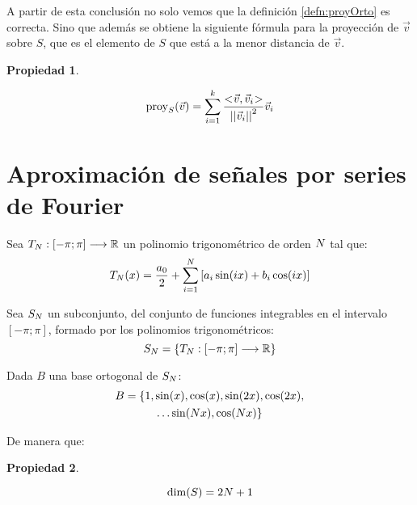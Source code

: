 \documentclass[a5paper,12pt,twoside]{book}
\newtheorem{prop}{{Propiedad}}[chapter]
\begin{document}
A partir de esta conclusión no solo vemos que la definición \ref{defn:proyOrto} es correcta.
Sino que además se obtiene la siguiente fórmula para la proyección de $\Vec{v}$ sobre $S$, que es el elemento de $S$ que está a la menor distancia de $\Vec{v}$.

\begin{mdframed}[style=PropertyFrame]
    \begin{prop}
        \label{prop:proyOrto2}
    \end{prop}
    \begin{equation*}
        \operatorname{proy}_S(\Vec{v}) = \sum_{i=1}^k \frac{<\hspace{-0.8mm}\Vec{v},\Vec{v}_i\hspace{-0.8mm}>}{{\left|\left| {\Vec{v}_i} \right|\right|}^2} \Vec{v}_i
    \end{equation*}
\end{mdframed}


\section{Aproximación de señales por series de Fourier}

Sea $T_N: \left[-\pi;\pi\right] \longrightarrow \mathbb{R}$ un polinomio trigonométrico de orden $N$ tal que:
\begin{equation*}
    T_N(x) = \frac{a_0}{2} + \sum_{i=1}^N \left[ a_i \sin(i x) + b_i \cos(i x) \right]
\end{equation*}

Sea $S_N$ un subconjunto, del conjunto de funciones integrables en el intervalo $[-\pi;\pi]$, formado por los polinomios trigonométricos:
\begin{equation*}
    S_N = { \left\{ {T_N: \left[-\pi;\pi\right] \longrightarrow \mathbb{R}} \right\} }
\end{equation*}

Dada $B$ una base ortogonal de $S_N$:
\begin{multline*}
    B = \{ 1 , \sin(x) , \cos(x) , \sin(2x) , \cos(2x) ,
    \\
    \dots \sin(N x) , \cos(N x) \}
\end{multline*}

De manera que:

\begin{mdframed}[style=PropertyFrame]
    \begin{prop}
    \end{prop}
    \begin{equation*}
        \operatorname{dim}(S) = 2 N + 1
    \end{equation*}
\end{mdframed}
\end{document}
